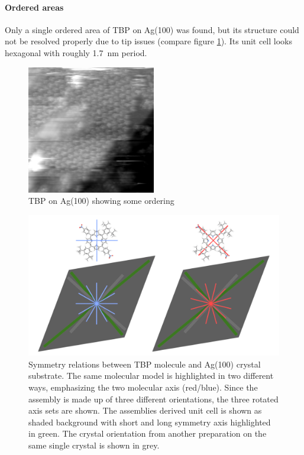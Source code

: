 \label{appendix:TBP}
\paragraph{Ordered areas}
Only a single ordered area of TBP on Ag(100) was found, but its structure could not be resolved properly due to tip issues (compare figure \ref{fig:hex-TBP-Ag100}). Its unit cell looks hexagonal with roughly \SI{1.7} {\nano \meter} period. 

\begin{figure}[h]
	\centering
	\includegraphics[width=0.5\textwidth]{./images/F151007-112800}
	\caption{TBP on Ag(100) showing some ordering}
	\label{fig:hex-TBP-Ag100}
\end{figure}
	\begin{figure}[]
		\centering
		\includegraphics[width=\textwidth]{./images/F160429-185245-R-model-2-crystal-orientation.png}
		\caption{Symmetry relations between TBP molecule and Ag(100) crystal substrate. The same molecular model is highlighted in two different ways, emphasizing the two molecular axis (red/blue). Since the assembly is made up of three different orientations, the three rotated axis sets are shown. The assemblies derived unit cell is shown as shaded background with short and long symmetry axis highlighted in green. The crystal orientation from another preparation on the same single crystal is shown in grey.}
		\label{F160429-185245-R-model-2-crystal-orientation.png}			
	\end{figure}
	\vfill
\restoregeometry